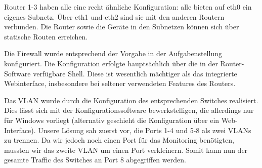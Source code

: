 \documentclass[10pt,a4paper]{article}
\begin{document}
	Router 1-3 haben alle eine recht ähnliche Konfiguration: alle bieten auf eth0 ein eigenes Subnetz. Über eth1 und eth2 sind sie mit den anderen Routern verbunden. Die Router sowie die Geräte in den Subnetzen können sich über statische Routen erreichen. \par 
	
	Die Firewall wurde entsprechend der Vorgabe in der Aufgabenstellung konfiguriert. Die Konfiguration erfolgte hauptsächlich über die in der Router-Software verfügbare Shell. Diese ist wesentlich mächtiger als das integrierte Webinterface, insbesondere bei seltener verwendeten Features des Routers. \par 
	
	Das VLAN wurde durch die Konfiguration des entsprechenden Switches realisiert. Dies lässt sich mit der Konfigurationssoftware bewerkstelligen, die allerdings nur für Windows vorliegt (alternativ geschieht die Konfiguration über ein Web-Interface). Unsere Lösung sah zuerst vor,  die Ports 1-4 und 5-8 als zwei VLANs zu trennen. Da wir jedoch noch einen Port für das Monitoring benötigten, mussten wir das zweite VLAN um einen Port verkleinern. Somit kann nun der gesamte Traffic des Switches an Port 8 abgegriffen werden. \par 
\end{document}
